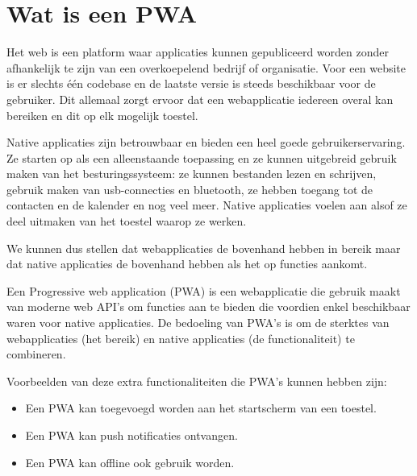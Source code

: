 
\section{Wat is een PWA}


Het web is een platform waar applicaties kunnen gepubliceerd worden zonder afhankelijk te zijn van een overkoepelend bedrijf of organisatie. Voor een website is er slechts één codebase en de laatste versie is steeds beschikbaar voor de gebruiker. 
Dit allemaal zorgt ervoor dat een webapplicatie iedereen overal kan bereiken en dit op elk mogelijk toestel.

Native applicaties zijn betrouwbaar en bieden een heel goede gebruikerservaring. Ze starten op als een alleenstaande toepassing en ze kunnen uitgebreid gebruik maken van het besturingssysteem: ze kunnen bestanden lezen en schrijven, gebruik maken van usb-connecties en bluetooth, ze hebben toegang tot de contacten en de kalender en nog veel meer. Native applicaties voelen aan alsof ze deel uitmaken van het toestel waarop ze werken.

We kunnen dus stellen dat webapplicaties de bovenhand hebben in bereik maar dat native applicaties de bovenhand hebben als het op functies aankomt.

Een Progressive web application (PWA) is een webapplicatie die gebruik maakt van moderne web API’s om functies aan te bieden die voordien enkel beschikbaar waren voor native applicaties. De bedoeling van PWA’s is om de sterktes van webapplicaties (het bereik) en native applicaties (de functionaliteit) te combineren. 

\autocite{Richard2020}
\autocite{Google2020}

Voorbeelden van deze extra functionaliteiten die PWA's kunnen hebben zijn: 

\begin{itemize}
	\item Een PWA kan toegevoegd worden aan het startscherm van een toestel.
	\item Een PWA kan push notificaties ontvangen.
	\item Een PWA kan offline ook gebruik worden.
\end{itemize}




